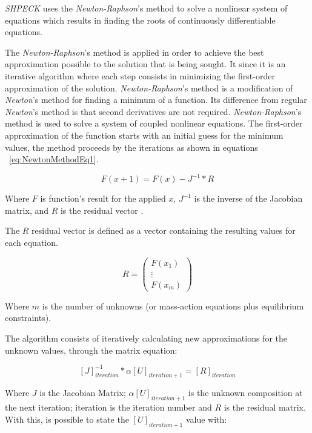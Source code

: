 \emph{SHPECK} uses the \emph{Newton-Raphson}'s method to solve a nonlinear system of equations which results in finding the roots of continuously differentiable equations. 

The \emph{Newton-Raphson}'s method is applied in order to achieve the best approximation possible to the solution that is being sought. It since it is an iterative algorithm where each step consists in minimizing the first-order approximation of the solution. \emph{Newton-Raphson}'s method is a modification of \emph{Newton}'s method for finding a minimum of a function. Its difference from regular \emph{Newton}'s method is that second derivatives are not required. \emph{Newton-Raphson}'s method is used to solve a system of coupled nonlinear equations. The first-order approximation of the function starts with an initial guess for the minimum values, the method proceeds by the iterations as shown in equations ~\ref{eq:NewtonMethodEq1}.

\begin{equation}
\label{eq:NewtonMethodEq1}
F(x+1) = F(x) - J^{-1} * R
\end{equation}

Where $F$ is function's result for the applied $x$, $J^{-1}$ is the inverse of the Jacobian matrix, and $R$ is the residual vector \cite{Isaacson:66}.

The $R$ residual vector is defined as a vector containing the resulting values for each equation.

\begin{equation}
\label{eq:residualVector}
R = \begin{pmatrix}
 F(x_1) \\
 \vdots \\
 F(x_m)
 \end{pmatrix}
\end{equation}

Where $m$ is the number of unknowns (or mass-action equations plus equilibrium constraints).


The algorithm consists of iteratively calculating new approximations for the unknown values, through the matrix equation:

\begin{equation}
\label{eq:iterativelyAlgorithm}
[J]^{-1}_{iteration}* \alpha [U]_{iteration+1} = [R]_{iteration}
\end{equation}

Where $J$ is the Jacobian Matrix; $ \alpha [U]_{iteration+1} $ is the unknown composition at the next iteration; iteration is the iteration number and $R$ is the residual matrix. With this, is possible to state the $[U]_{iteration+1}$ value with:

